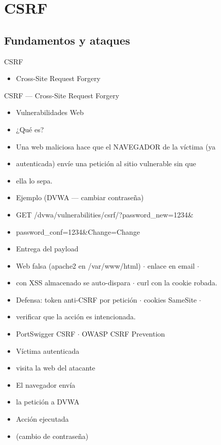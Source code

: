 \documentclass[aspectratio=169,10pt]{beamer}
\begin{document}
\section{CSRF}
\subsection{Fundamentos y ataques}


\begin{frame}[allowframebreaks]{CSRF}
\small
  \begin{itemize}
  \item Cross-Site Request Forgery
  \end{itemize}
\end{frame}

\begin{frame}[allowframebreaks]{CSRF --- Cross-Site Request Forgery}
\small
  \begin{itemize}
  \item Vulnerabilidades Web
  \item ¿Qué es?
  \item Una web maliciosa hace que el NAVEGADOR de la víctima (ya
  \item autenticada) envíe una petición al sitio vulnerable sin que
  \item ella lo sepa.
  \item Ejemplo (DVWA --- cambiar contraseña)
  \item GET /dvwa/vulnerabilities/csrf/?password\_new=1234\&
  \item password\_conf=1234\&Change=Change
  \item Entrega del payload
  \item Web falsa (apache2 en /var/www/html) $\cdot$ enlace en email $\cdot$
  \item con XSS almacenado se auto-dispara $\cdot$ curl con la cookie robada.
  \item Defensa: token anti-CSRF por petición $\cdot$ cookies SameSite $\cdot$
  \item verificar que la acción es intencionada.
  \item PortSwigger CSRF $\cdot$ OWASP CSRF Prevention
  \item Víctima autenticada
  \item visita la web del atacante
  \item El navegador envía
  \item la petición a DVWA
  \item Acción ejecutada
  \item (cambio de contraseña)
  \end{itemize}
\end{frame}
\end{document}
